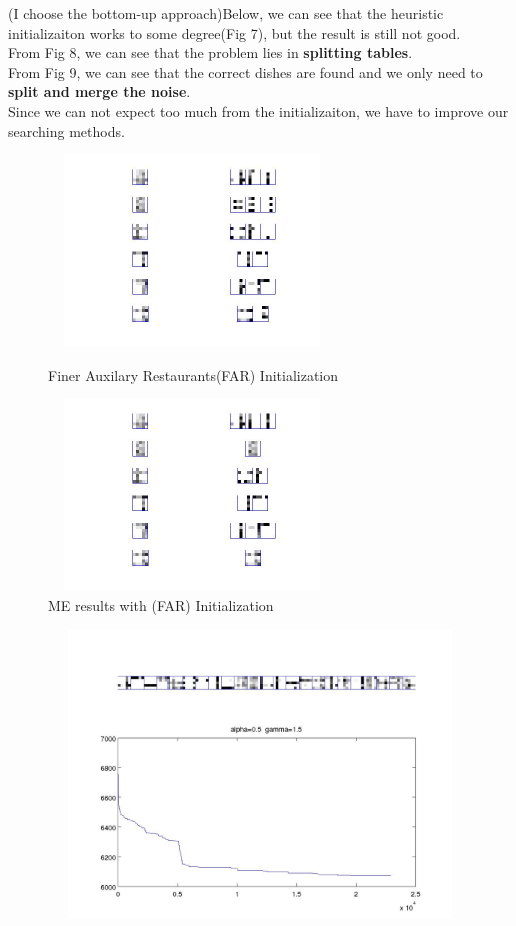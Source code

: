 \documentclass{article}
\begin{document}
\begin{spacing}{1.1}
(I choose the bottom-up approach)Below, we can see that the heuristic initializaiton works to some degree(Fig 7), but the result is still not good.\\
From Fig 8, we can see that the problem lies in {\bf splitting tables}.\\
From Fig 9, we can see that the correct dishes are found and we only need to {\bf split and merge the noise}.\\
Since we can not expect too much from the initializaiton, we have to improve our searching methods.

\begin{figure}[h] 
  \begin{minipage}[b]{0.5\textwidth} 
    \centering 
    \includegraphics[width=3in,height=2in]{shape_init.jpg} 
    \caption{Finer Auxilary Restaurants(FAR) Initialization} 
    \label{fig:by:table} 
  \end{minipage}%
  \begin{minipage}[b]{0.5\textwidth} 
    \centering 
    \includegraphics[width=3in,height=2in]{shape_end.jpg} 
    \caption{ME results with (FAR) Initialization}
    \label{fig:by:table}  
   \end{minipage}%
\end{figure}
\begin{figure}[h] 
    \centering 
    \includegraphics[width=5in,height=3in]{shape.jpg} 

\end{figure}
\end{spacing}
\end{document}
